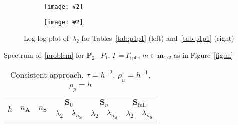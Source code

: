 \documentclass[12pt]{article}
\newcommand{\includegraphicsw}[2][1.]{\texttt{[image: \#2]}}
\newcommand{\vect}[1]{\boldsymbol{\mathbf{#1}}}
\newcommand{\sphere}{{\Gamma_{\text{sph}}}}
\newcommand{\tor}{{\Gamma_{\text{tor}}}}
\begin{document}
\vfill
\begin{figure}[h]
	\centering\small
	\begin{subfigure}{.49\linewidth}
		\centering
		\includegraphicsw{sphere_2_P1P1.png}
	\end{subfigure}%
	\hfill
	\begin{subfigure}{.49\linewidth}
		\centering
		\includegraphicsw{torus_P1P1.png}
	\end{subfigure}
	\caption{Log-log plot of~$\lambda_2$ for Tables~\ref{tab:p1p1} (left) and~\ref{tab:p1p1} (right)}
\end{figure}
\vfill
\clearpage
\vfill
\begin{table}[h]
	\centering\small
	\caption{Spectrum of~\eqref{problem} for $\vect P_2$\,--\,$P_1$, $\Gamma = \sphere$, $m \in \vect m_{1/2}$ as in Figure~\ref{fig:m}} 
	\label{tab:p2p1}
	\begin{subtable}{1.\linewidth}
		\centering
		\caption{Consistent approach, $\tau = h^{-2}$, $\rho_u = h^{-1}$, $\rho_p = h$}
		\label{tab:p2p1:sph}
		\begin{tabular}[1.3]{|c|c|c|c|c|c|c|c|c|}
			\hline
			\multirow{2}{*}{$h$} & \multirow{2}{*}{$n_{\vect A}$} & \multirow{2}{*}{$n_{\vect S}$} & \multicolumn{2}{c|}{$\vect S_0$} & \multicolumn{2}{c|}{$\vect S_n$} & \multicolumn{2}{c|}{$\vect S_{\text{full}}$} \\ 
			\cline{4-9}
			& & & $\lambda_2$ & $\lambda_{n_{\vect S}}$ & $\lambda_2$ & $\lambda_{n_{\vect S}}$ & $\lambda_2$ & $\lambda_{n_{\vect S}}$ \\ 
			\hline
			
		\end{tabular}
	\end{subtable}%
%			
\end{table}
\end{document}
